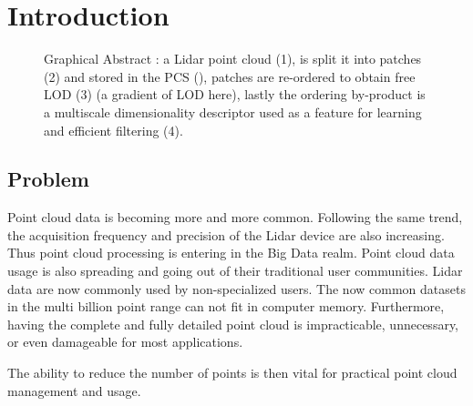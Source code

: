 

\section{Introduction}

\begin{figure}[t!]
	\begin{center}
		\caption{Graphical Abstract : a Lidar point cloud (1), is split it into patches (2) 
		and stored in the PCS (\cite{Cura2015}), patches are re-ordered to obtain free LOD 
		(3) (a gradient of LOD here), lastly the ordering by-product is a multiscale dimensionality descriptor used as a feature for learning and efficient filtering (4).} 
		\label{lod.fig:banner_image}
	\end{center}
\end{figure} 

\subsection{Problem}  
	Point cloud data is becoming more and more common. Following the same trend, the acquisition frequency and precision of the Lidar device are also increasing.
	Thus point cloud processing is entering in the Big Data realm.
	Point cloud data usage is also spreading and going out of their traditional user communities. 
	Lidar data are now commonly used by non-specialized users. 
	The now common datasets in the multi billion point range can not fit in computer memory. 
	Furthermore, having the complete and fully detailed point cloud is impracticable, unnecessary, or even damageable for most applications.
	
	The ability to reduce the number of points is then vital for practical point cloud management and usage.
 
